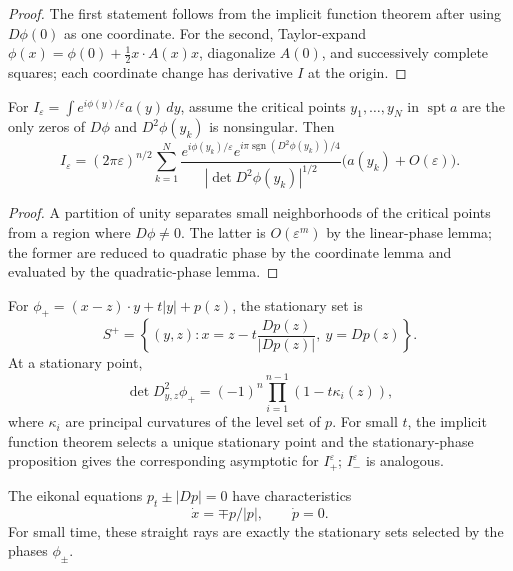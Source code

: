 \begin{proof}
\sketch The first statement follows from the implicit function theorem after
using $D\phi(0)$ as one coordinate. For the second, Taylor-expand
$\phi(x)=\phi(0)+\frac12x\cdot A(x)x$, diagonalize $A(0)$, and successively
complete squares; each coordinate change has derivative $I$ at the origin.
\end{proof}

\begin{proposition}
\label{prop:stationary-phase-asymptotic-formula}
For $I_\varepsilon=\int e^{i\phi(y)/\varepsilon}a(y)\,dy$, assume the
critical points $y_1,\ldots,y_N$ in $\operatorname{spt}a$ are the only zeros
of $D\phi$ and $D^2\phi(y_k)$ is nonsingular. Then
\[
I_\varepsilon=(2\pi\varepsilon)^{n/2}\sum_{k=1}^N
\frac{e^{i\phi(y_k)/\varepsilon}e^{i\pi\operatorname{sgn}(D^2\phi(y_k))/4}}
{|\det D^2\phi(y_k)|^{1/2}}\big(a(y_k)+O(\varepsilon)\big).
\]
\end{proposition}

\begin{proof}
\sketch A partition of unity separates small neighborhoods of the critical
points from a region where $D\phi\ne0$. The latter is $O(\varepsilon^m)$ by
the linear-phase lemma; the former are reduced to quadratic phase by the
coordinate lemma and evaluated by the quadratic-phase lemma.
\end{proof}

\begin{example}
\label{ex:stationary-phase-wave-equation-continued}
For $\phi_+=(x-z)\cdot y+t|y|+p(z)$, the stationary set is
\[
S^+=\left\{(y,z):x=z-t\frac{Dp(z)}{|Dp(z)|},\ y=Dp(z)\right\}.
\]
At a stationary point,
\[
\det D^2_{y,z}\phi_+=(-1)^n\prod_{i=1}^{n-1}(1-t\kappa_i(z)),
\]
where $\kappa_i$ are principal curvatures of the level set of $p$. For small
$t$, the implicit function theorem selects a unique stationary point and the
stationary-phase proposition gives the corresponding asymptotic for
$I_+^\varepsilon$; $I_-^\varepsilon$ is analogous.
\end{example}

\begin{remark}
\label{rem:optics-stationary-phase-connection}
The eikonal equations $p_t\pm|Dp|=0$ have characteristics
\[
\dot x=\mp p/|p|,\qquad \dot p=0.
\]
For small time, these straight rays are exactly the stationary sets selected
by the phases $\phi_\pm$.
\end{remark}

